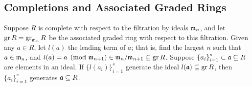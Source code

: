 
\subsection*{Completions and Associated Graded Rings}

\begin{proposition}\label{prop:graded-ring-generators}
    Suppose \(R\) is complete with respect to the filtration by ideals \(\mathfrak{m}_n\),
    and let \(\operatorname{gr} R = \operatorname{gr}_{\mathfrak{m}_n} R\) be the associated graded ring with respect to this filtration.
    Given any \(a \in R\), let \(l(a)\) the leading term of \(a\);
    that is, find the largest \(n\) such that \(a \in \mathfrak{m}_n\),
    and \(l(a) = a \pmod{\mathfrak{m}_{n+1}} \in \mathfrak{m}_n/\mathfrak{m}_{n+1} \subseteq \operatorname{gr} R\).
    Suppose \({\{a_i\}}_{i=1}^s \subset \mathfrak{a} \subseteq R\) are elements in an ideal.
    If \({\{l(a_i)\}}_{i=1}^s\) generate the ideal \(l(\mathfrak{a}) \subseteq \operatorname{gr} R\),
    then \({\{a_i\}}_{i=1}^s\) generates \(\mathfrak{a} \subseteq R\).
\end{proposition}
